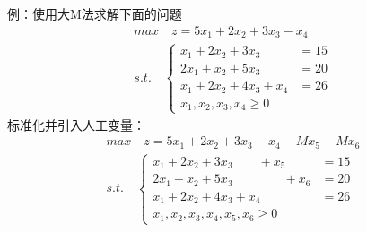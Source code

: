 \documentclass{book}
\begin{document}
例：使用大M法求解下面的问题
$$
    \begin{aligned}
         & max\quad z=5x_1+2x_2+3x_3-x_4 & \\
         & s.t.\quad
        \begin{cases}
            x_1+2x_2+3x_3     & = 15 \\
            2x_1+x_2+5x_3     & = 20 \\
            x_1+2x_2+4x_3+x_4 & = 26 \\
            x_1,x_2,x_3,x_4\ge0
        \end{cases}
    \end{aligned}
$$
标准化并引入人工变量：
$$
    \begin{aligned}
         & max\quad z=5x_1+2x_2+3x_3-x_4-Mx_5-Mx_6 & \\
         & s.t.\quad
        \begin{cases}
            x_1+2x_2+3x_3\qquad+x_5       & = 15 \\
            2x_1+x_2+5x_3\qquad\qquad+x_6 & = 20 \\
            x_1+2x_2+4x_3+x_4             & = 26 \\
            x_1,x_2,x_3,x_4,x_5,x_6\ge0
        \end{cases}
    \end{aligned}
$$
\end{document}
